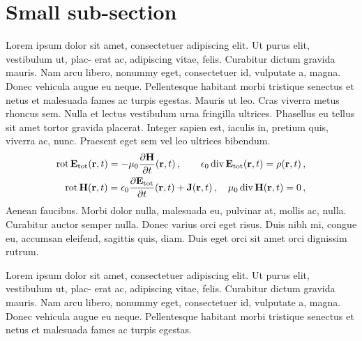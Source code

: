 \section{Small sub-section}

Lorem ipsum dolor sit amet, consectetuer adipiscing elit. Ut purus elit, vestibulum ut, plac- erat ac, adipiscing vitae, felis. Curabitur dictum gravida mauris. Nam arcu libero, nonummy eget, consectetuer id, vulputate a, magna. Donec vehicula augue eu neque. Pellentesque habitant morbi tristique senectus et netus et malesuada fames ac turpis egestas. Mauris ut leo. Cras viverra metus rhoncus sem. Nulla et lectus vestibulum urna fringilla ultrices. Phasellus eu tellus sit amet tortor gravida placerat. Integer sapien est, iaculis in, pretium quis, viverra ac, nunc. Praesent eget sem vel leo ultrices bibendum. 
\begin{align} \label{Maxwell}
{\mathrm{rot}} \, {\mathbf{E}}_{\rm tot}({\mathbf{r}},t) = -  \mu_0 \frac{\partial {\mathbf{H}}}{\partial t}({\mathbf{r}},t)\, ,  \qquad \epsilon_0 \, \mathrm{div} \, {\mathbf{E}}_{\rm tot}({\mathbf{r}},t) = \rho({\mathbf{r}},t) \, , \nonumber\\
{\mathrm{rot}} \, {\mathbf{H}}({\mathbf{r}},t) =  \epsilon_0 \frac{\partial {\mathbf{E}}_{\rm tot}}{\partial t}({\mathbf{r}},t) + {\mathbf{J}} ({\mathbf{r}},t)\, ,  \quad \mu_0 \, \mathrm{div} \, {\mathbf{H}}({\mathbf{r}},t) = 0 \, , 
\end{align}
Aenean faucibus. Morbi dolor nulla, malesuada eu, pulvinar at, mollis ac, nulla. Curabitur auctor semper nulla. Donec varius orci eget risus. Duis nibh mi, congue eu, accumsan eleifend, sagittis quis, diam. Duis eget orci sit amet orci dignissim rutrum.

\begin{remark}[Lorem]
Lorem ipsum dolor sit amet, consectetuer adipiscing elit. Ut purus elit, vestibulum ut, plac- erat ac, adipiscing vitae, felis. Curabitur dictum gravida mauris. Nam arcu libero, nonummy eget, consectetuer id, vulputate a, magna. Donec vehicula augue eu neque. Pellentesque habitant morbi tristique senectus et netus et malesuada fames ac turpis egestas. 
\end{remark}


%

